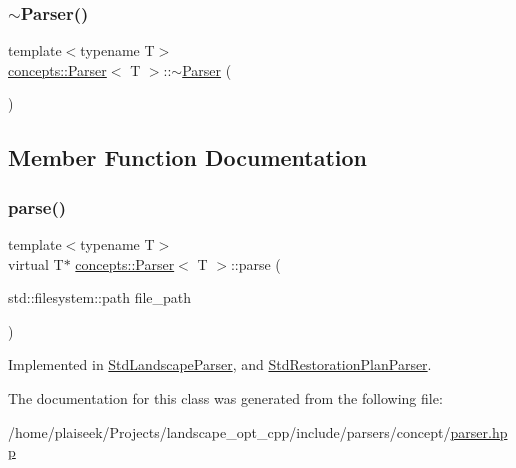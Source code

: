 \mbox{\label{classconcepts_1_1_parser_ab80c529e217209d73ee57a1caf166710}} 
\subsubsection{\texorpdfstring{$\sim$\+Parser()}{~Parser()}}
{\footnotesize\ttfamily template$<$typename T$>$ \\
\hyperlink{classconcepts_1_1_parser}{concepts\+::\+Parser}$<$ T $>$\+::$\sim$\hyperlink{classconcepts_1_1_parser}{Parser} (\begin{DoxyParamCaption}{ }\end{DoxyParamCaption})\hspace{0.3cm}{\ttfamily [inline]}}



\subsection{Member Function Documentation}
\mbox{\label{classconcepts_1_1_parser_ac5e6fbf08f6d462695c946647aafb2ce}} 
\subsubsection{\texorpdfstring{parse()}{parse()}}
{\footnotesize\ttfamily template$<$typename T$>$ \\
virtual T$\ast$ \hyperlink{classconcepts_1_1_parser}{concepts\+::\+Parser}$<$ T $>$\+::parse (\begin{DoxyParamCaption}\item[{std\+::filesystem\+::path}]{file\+\_\+path }\end{DoxyParamCaption})\hspace{0.3cm}{\ttfamily [pure virtual]}}



Implemented in \hyperlink{class_std_landscape_parser_a73c807c756f6f6a90d23d95d91a4e700}{Std\+Landscape\+Parser}, and \hyperlink{class_std_restoration_plan_parser_aa9156823445695123f32e2eb232a3509}{Std\+Restoration\+Plan\+Parser}.



The documentation for this class was generated from the following file\+:\begin{DoxyCompactItemize}
\item 
/home/plaiseek/\+Projects/landscape\+\_\+opt\+\_\+cpp/include/parsers/concept/\hyperlink{parser_8hpp}{parser.\+hpp}\end{DoxyCompactItemize}
